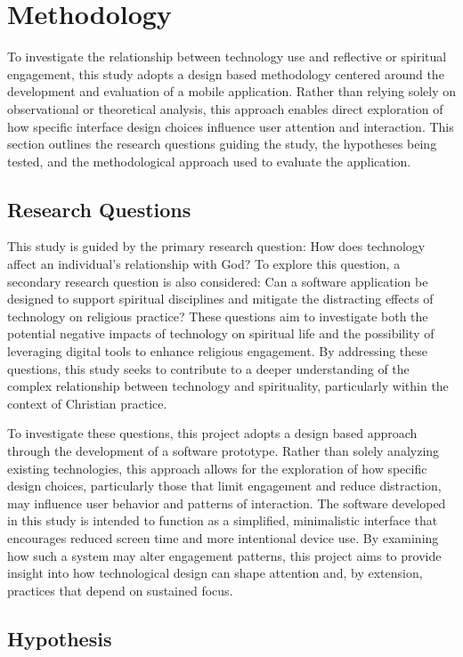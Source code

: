 \documentclass[12pt]{article}
\begin{document}
\section{Methodology}

To investigate the relationship between technology use and reflective or spiritual engagement, this study adopts a design based methodology centered around the development and evaluation of a mobile application. Rather than relying solely on observational or theoretical analysis, this approach enables direct exploration of how specific interface design choices influence user attention and interaction. This section outlines the research questions guiding the study, the hypotheses being tested, and the methodological approach used to evaluate the application. 

\subsection{Research Questions}
This study is guided by the primary research question: How does technology affect an individual's relationship with God? To explore this question, a secondary research question is also considered: Can a software application be designed to support spiritual disciplines and mitigate the distracting effects of technology on religious practice? These questions aim to investigate both the potential negative impacts of technology on spiritual life and the possibility of leveraging digital tools to enhance religious engagement. By addressing these questions, this study seeks to contribute to a deeper understanding of the complex relationship between technology and spirituality, particularly within the context of Christian practice. 

To investigate these questions, this project adopts a design based approach through the development of a software prototype. Rather than solely analyzing existing technologies, this approach allows for the exploration of how specific design choices, particularly those that limit engagement and reduce distraction, may influence user behavior and patterns of interaction. The software developed in this study is intended to function as a simplified, minimalistic interface that encourages reduced screen time and more intentional device use. By examining how such a system may alter engagement patterns, this project aims to provide insight into how technological design can shape attention and, by extension, practices that depend on sustained focus.
\subsection{Hypothesis}
\end{document}
